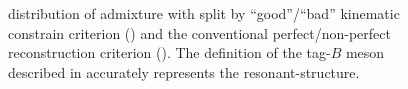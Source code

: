 \begin{figure}[htbp!]
    \centering
    \caption{\label{fig:good_tag_definitions} \Mbc distribution of \BtoXsgamma admixture with split by ``good''/``bad'' kinematic constrain criterion ()
    and the conventional perfect/non-perfect reconstruction criterion ().
    The definition of the tag-$B$ meson described in 
    accurately represents the resonant-\Mbc structure.
    }
\end{figure}